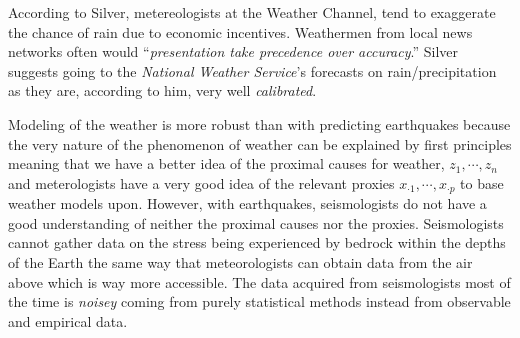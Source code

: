\documentclass[12pt]{article}
\begin{document}
\begin{enumerate}
\begin{tcolorbox}[colback = white, sharp corners]
\end{tcolorbox}



\begin{tcolorbox}[colback = white, sharp corners]
According to Silver, metereologists at the Weather Channel, tend to exaggerate the chance of rain due to economic incentives. Weathermen from local news networks often would ``\emph{presentation take precedence over accuracy}.'' Silver suggests going to the \emph{National Weather Service}'s forecasts on rain/precipitation as they are, according to him, very well \emph{calibrated}.

\end{tcolorbox}

\newpage

\begin{tcolorbox}[colback = white, sharp corners]

Modeling of the weather is more robust than with predicting earthquakes because the very nature of the phenomenon of weather can be explained by first principles meaning that we have a better idea of the proximal causes for weather, $z_1, \cdots, z_n$ and meterologists have a very good idea of the relevant proxies $x_{ \cdot 1}, \cdots, x_{\cdot p}$ to base weather models upon. However, with earthquakes, seismologists do not have a good understanding of neither the proximal causes nor the proxies. Seismologists cannot gather data on the stress being experienced by bedrock within the depths of the Earth the same way that meteorologists can obtain data from the air above which is way more accessible. The data acquired from seismologists most of the time is \emph{noisey} coming from purely statistical methods instead from observable and empirical data.
\end{tcolorbox}


\end{enumerate}
\end{document}
